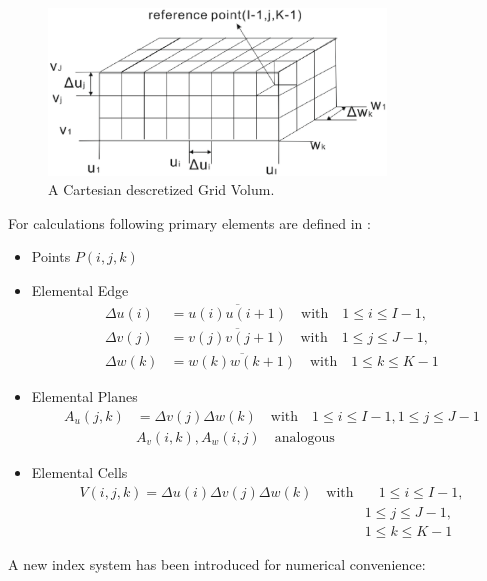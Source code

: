 \begin{figure}[!ht]
\centering
\includegraphics[width=0.8\textwidth]{bilder/grid_volum}
\caption{A Cartesian descretized Grid Volum\cite{script_FeldSim}.}
\label{fig:discretization_material}
\end{figure}
For calculations following primary elements are defined in \cite{script_FeldSim}:
\begin{itemize}
\item Points $P(i,j,k)$
\item Elemental Edge
    \begin{align*}
		\Delta u(i)&=\overline{u(i)u(i+1)}  \quad \mathrm{with}  \quad 1\leq i \leq I-1, \nonumber\\
		\Delta v(j)&=\overline{v(j)v(j+1)}  \quad \mathrm{with}  \quad 1\leq j \leq J-1, \nonumber\\
		\Delta w(k)&=\overline{w(k)w(k+1)}  \quad \mathrm{with}  \quad 1\leq k \leq K-1
		\end{align*}
\item Elemental Planes
		\begin{align*}
		A_{u}(j,k)&=\Delta v(j)\Delta w(k) \quad \mathrm{with}  \quad 1\leq i \leq I-1,1\leq j \leq J-1\nonumber\\
		&A_{v}(i,k),A_{w}(i,j)  \quad \mathrm{analogous}
		\end{align*}
\item Elemental Cells
		\begin{align*}
		V(i,j,k)=\Delta u(i)\Delta v(j)\Delta w(k)  \quad \mathrm{with}  &\quad 1\leq i\leq I-1,\nonumber\\
		&1\leq j\leq J-1,\nonumber\\
		&1\leq k\leq K-1
		\end{align*}
\end{itemize}
A new index system has been introduced for numerical convenience:

